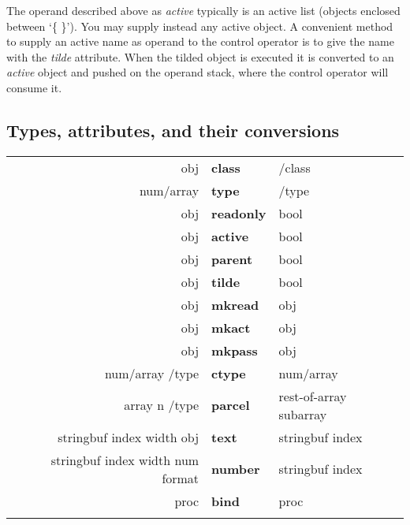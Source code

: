 The operand described above as \emph{active} typically is an active
list (objects enclosed between `\{ \}'). You may supply instead any
active object. A convenient method to supply an active name as operand
to the control operator is to give the name with the \emph{tilde}
attribute. When the tilded object is executed it is converted to an
\emph{active} object and pushed on the operand stack, where the
control operator will consume it.


\subsection{Types, attributes, and their conversions}

\begin{tabular}{>{\sffamily}r>{\sffamily\bfseries}l>{\sffamily}l}
obj                              & class    & /class\\
num/array                        & type     & /type\\
obj                              & readonly & bool\\
obj                              & active   & bool\\
obj                              & parent   & bool\\
obj                              & tilde    & bool\\
obj                              & mkread   & obj\\
obj                              & mkact    & obj\\
obj                              & mkpass   & obj\\
num/array /type                  & ctype    & num/array\\
array n /type                    & parcel   & rest-of-array subarray\\
stringbuf index width obj        & text     & stringbuf index\\
stringbuf index width num format & number   & stringbuf index\\
proc                             & bind     & proc\\\\
\end{tabular}


